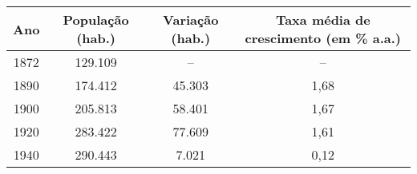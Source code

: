 \begin{table}[!htp]
\centering
{}
{\begin{tabular}{cccc}
\hline 
Ano & População (hab.) & Variação (hab.) & Taxa média de crescimento (em \% a.a.) \\ 
\hline\hline
1872 & 129.109 & -- & -- \\ 
1890 & 174.412 & 45.303 & 1,68 \\ 
1900 & 205.813 & 58.401 & 1,67 \\ 
1920 & 283.422 & 77.609 & 1,61 \\ 
1940 & 290.443 & 7.021 & 0,12 \\ 
\hline 
\end{tabular} }{
}
\end{table}